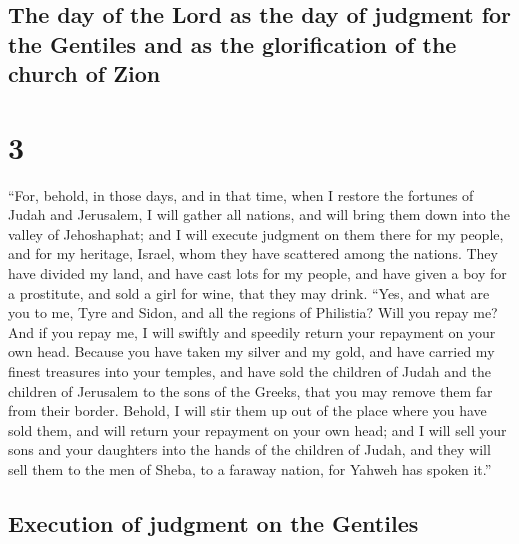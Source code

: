 \begin{paracol}{2}
\begin{otherlanguage}{english}
\hypertarget{the-day-of-the-lord-as-the-day-of-judgment-for-the-gentiles-and-as-the-glorification-of-the-church-of-zion}{%
\subsection{The day of the Lord as the day of judgment for the Gentiles
and as the glorification of the church of
Zion}\label{the-day-of-the-lord-as-the-day-of-judgment-for-the-gentiles-and-as-the-glorification-of-the-church-of-zion}}

\hypertarget{section-5}{%
\section{3}\label{section-5}}

 ``For, behold, in those days, and in that time, when I
restore the fortunes of Judah and Jerusalem,  I will
gather all nations, and will bring them down into the valley of
Jehoshaphat; and I will execute judgment on them there for my people,
and for my heritage, Israel, whom they have scattered among the nations.
They have divided my land,  and have cast lots for my
people, and have given a boy for a prostitute, and sold a girl for wine,
that they may drink.  ``Yes, and what are you to me, Tyre
and Sidon, and all the regions of Philistia? Will you repay me? And if
you repay me, I will swiftly and speedily return your repayment on your
own head.  Because you have taken my silver and my gold,
and have carried my finest treasures into your temples, 
and have sold the children of Judah and the children of Jerusalem to the
sons of the Greeks, that you may remove them far from their border.
 Behold, I will stir them up out of the place where you
have sold them, and will return your repayment on your own head;
 and I will sell your sons and your daughters into the
hands of the children of Judah, and they will sell them to the men of
Sheba, to a faraway nation, for Yahweh has spoken it.''

\hypertarget{execution-of-judgment-on-the-gentiles}{%
\subsection{Execution of judgment on the
Gentiles}\label{execution-of-judgment-on-the-gentiles}}


\end{otherlanguage}
\end{paracol}
